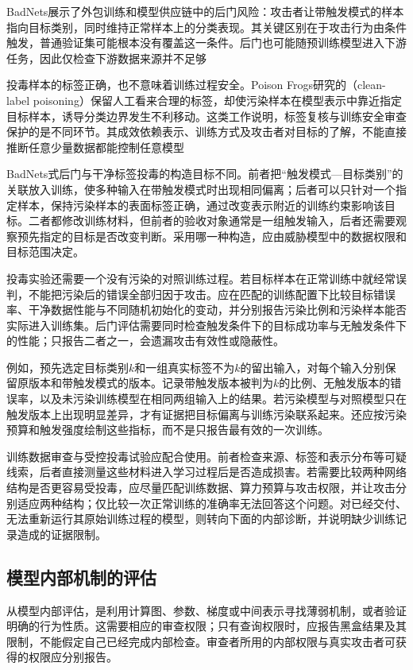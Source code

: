 BadNets展示了外包训练和模型供应链中的后门风险：攻击者让带触发模式的样本指向目标类别，同时维持正常样本上的分类表现。其关键区别在于攻击行为由条件触发，普通验证集可能根本没有覆盖这一条件。后门也可能随预训练模型进入下游任务，因此仅检查下游数据来源并不足够

投毒样本的标签正确，也不意味着训练过程安全。Poison Frogs研究的（clean-label poisoning）保留人工看来合理的标签，却使污染样本在模型表示中靠近指定目标样本，诱导分类边界发生不利移动。这类工作说明，标签复核与训练安全审查保护的是不同环节。其成效依赖表示、训练方式及攻击者对目标的了解，不能直接推断任意少量数据都能控制任意模型

BadNets式后门与干净标签投毒的构造目标不同。前者把“触发模式—目标类别”的关联放入训练，使多种输入在带触发模式时出现相同偏离；后者可以只针对一个指定样本，保持污染样本的表面标签正确，通过改变表示附近的训练约束影响该目标。二者都修改训练材料，但前者的验收对象通常是一组触发输入，后者还需要观察预先指定的目标是否改变判断。采用哪一种构造，应由威胁模型中的数据权限和目标范围决定。

投毒实验还需要一个没有污染的对照训练过程。若目标样本在正常训练中就经常误判，不能把污染后的错误全部归因于攻击。应在匹配的训练配置下比较目标错误率、干净数据性能与不同随机初始化的变动，并分别报告污染比例和污染样本能否实际进入训练集。后门评估需要同时检查触发条件下的目标成功率与无触发条件下的性能；只报告二者之一，会遗漏攻击有效性或隐蔽性。

例如，预先选定目标类别$k$和一组真实标签不为$k$的留出输入，对每个输入分别保留原版本和带触发模式的版本。记录带触发版本被判为$k$的比例、无触发版本的错误率，以及未污染训练模型在相同两组输入上的结果。若污染模型与对照模型只在触发版本上出现明显差异，才有证据把目标偏离与训练污染联系起来。还应按污染预算和触发强度绘制这些指标，而不是只报告最有效的一次训练。

训练数据审查与受控投毒试验应配合使用。前者检查来源、标签和表示分布等可疑线索，后者直接测量这些材料进入学习过程后是否造成损害。若需要比较两种网络结构是否更容易受投毒，应尽量匹配训练数据、算力预算与攻击权限，并让攻击分别适应两种结构；仅比较一次正常训练的准确率无法回答这个问题。对已经交付、无法重新运行其原始训练过程的模型，则转向下面的内部诊断，并说明缺少训练记录造成的证据限制。

\subsection{模型内部机制的评估}
\label{sec:security-model-test}

从模型内部评估，是利用计算图、参数、梯度或中间表示寻找薄弱机制，或者验证明确的行为性质。这需要相应的审查权限；只有查询权限时，应报告黑盒结果及其限制，不能假定自己已经完成内部检查。审查者所用的内部权限与真实攻击者可获得的权限应分别报告。

